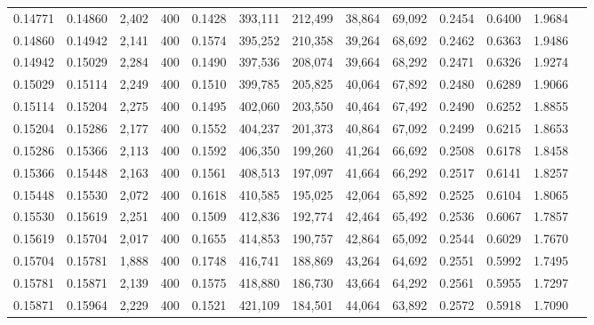 \begin{tabular}{rrrrrrrrrrrrr}
0.14771 & 0.14860 &  2,402 & 400 &                                     0.1428 & 393,111 & 212,499 &  38,864 &  69,092 & 0.2454 & 0.6400 & 1.9684 \\
0.14860 & 0.14942 &  2,141 & 400 &                                     0.1574 & 395,252 & 210,358 &  39,264 &  68,692 & 0.2462 & 0.6363 & 1.9486 \\
0.14942 & 0.15029 &  2,284 & 400 &                                     0.1490 & 397,536 & 208,074 &  39,664 &  68,292 & 0.2471 & 0.6326 & 1.9274 \\
0.15029 & 0.15114 &  2,249 & 400 &                                     0.1510 & 399,785 & 205,825 &  40,064 &  67,892 & 0.2480 & 0.6289 & 1.9066 \\
0.15114 & 0.15204 &  2,275 & 400 &                                     0.1495 & 402,060 & 203,550 &  40,464 &  67,492 & 0.2490 & 0.6252 & 1.8855 \\
0.15204 & 0.15286 &  2,177 & 400 &                                     0.1552 & 404,237 & 201,373 &  40,864 &  67,092 & 0.2499 & 0.6215 & 1.8653 \\
0.15286 & 0.15366 &  2,113 & 400 &                                     0.1592 & 406,350 & 199,260 &  41,264 &  66,692 & 0.2508 & 0.6178 & 1.8458 \\
0.15366 & 0.15448 &  2,163 & 400 &                                     0.1561 & 408,513 & 197,097 &  41,664 &  66,292 & 0.2517 & 0.6141 & 1.8257 \\
0.15448 & 0.15530 &  2,072 & 400 &                                     0.1618 & 410,585 & 195,025 &  42,064 &  65,892 & 0.2525 & 0.6104 & 1.8065 \\
0.15530 & 0.15619 &  2,251 & 400 &                                     0.1509 & 412,836 & 192,774 &  42,464 &  65,492 & 0.2536 & 0.6067 & 1.7857 \\
0.15619 & 0.15704 &  2,017 & 400 &                                     0.1655 & 414,853 & 190,757 &  42,864 &  65,092 & 0.2544 & 0.6029 & 1.7670 \\
0.15704 & 0.15781 &  1,888 & 400 &                                     0.1748 & 416,741 & 188,869 &  43,264 &  64,692 & 0.2551 & 0.5992 & 1.7495 \\
0.15781 & 0.15871 &  2,139 & 400 &                                     0.1575 & 418,880 & 186,730 &  43,664 &  64,292 & 0.2561 & 0.5955 & 1.7297 \\
0.15871 & 0.15964 &  2,229 & 400 &                                     0.1521 & 421,109 & 184,501 &  44,064 &  63,892 & 0.2572 & 0.5918 & 1.7090 \\

\end{tabular}
